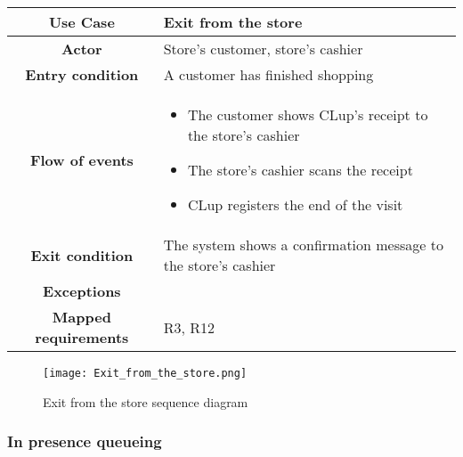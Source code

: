 \documentclass[../../main.tex]{subfiles}
\begin{document}
      \begin{table}[H]
        \centering
          \begin{tabular}{c m{}}
          \hline
          \textbf{Use Case} & Exit from the store\\ \hline
          \textbf{Actor} & Store's customer, store's cashier\\ \hline
          \textbf{Entry condition} & A customer has finished shopping\\  \hline
          \textbf{Flow of events} & \begin{itemize}
                                      \item The customer shows CLup's receipt to the store's cashier
                                      \item The store's cashier scans the receipt
                                      \item CLup registers the end of the visit
                                    \end{itemize}\\ \hline
          \textbf{Exit condition} & The system shows a confirmation message to the store's cashier \\ \hline
          \textbf{Exceptions} & \\ \hline
          \textbf{Mapped requirements} & R3, R12\\ \hline
          \end{tabular}
      \end{table}

      \begin{figure}[H]
        \centering
        \texttt{[image: Exit\_from\_the\_store.png]}
        \caption{Exit from the store sequence diagram}
      \end{figure}


      \subsubsection{In presence queueing}
\end{document}
